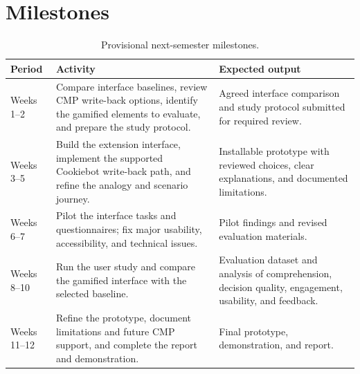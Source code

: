 \documentclass[11pt,a4paper]{report}
\begin{document}
\section{Milestones}
\begin{table}[H]
\centering
\small
\caption{Provisional next-semester milestones.}
\begin{tabular}{p{}p{}p{}}
\toprule
\textbf{Period} & \textbf{Activity} & \textbf{Expected output} \\
\midrule
Weeks 1--2 & Compare interface baselines, review CMP write-back options, identify the gamified elements to evaluate, and prepare the study protocol. & Agreed interface comparison and study protocol submitted for required review. \\
Weeks 3--5 & Build the extension interface, implement the supported Cookiebot write-back path, and refine the analogy and scenario journey. & Installable prototype with reviewed choices, clear explanations, and documented limitations. \\
Weeks 6--7 & Pilot the interface tasks and questionnaires; fix major usability, accessibility, and technical issues. & Pilot findings and revised evaluation materials. \\
Weeks 8--10 & Run the user study and compare the gamified interface with the selected baseline. & Evaluation dataset and analysis of comprehension, decision quality, engagement, usability, and feedback. \\
Weeks 11--12 & Refine the prototype, document limitations and future CMP support, and complete the report and demonstration. & Final prototype, demonstration, and report. \\
\bottomrule
\end{tabular}
\end{table}
\end{document}
